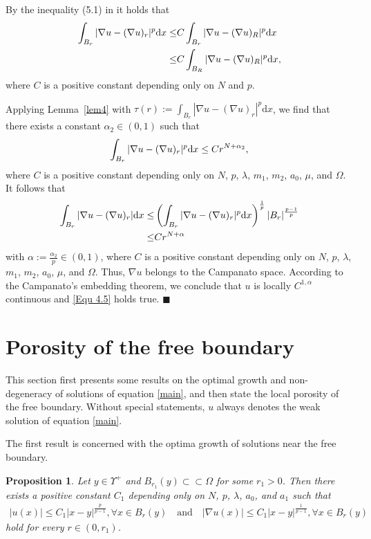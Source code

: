 \documentclass[onecolumn]{autart}
\newtheorem{proposition}{Proposition}
\newenvironment{proof}{{\it Proof: \enspace}}{\hfill $\blacksquare$\par}
\begin{document}
\begin{proof}
		By the inequality (5.1) in \cite{Lieberman:1991} it holds that
		\begin{align}
			\int_{B_r} |\nabla u - (\nabla u)_r|^p \mathrm{d}x
			\leq
			& C \int_{B_r} |\nabla u - (\nabla u)_R|^p \mathrm{d}x
			\notag\\ \leq
			&C \int_{B_R} |\nabla u - (\nabla u)_R|^p \mathrm{d}x,\notag
		\end{align}
		where $C$ is a positive  constant  depending only on $N$ and $p$.
		
		Applying Lemma~\ref{lem4}  with $\tau(r) := \int_{B_r} |\nabla u - (\nabla u)_r|^p\mathrm{d}x$, we find that there exists a constant $\alpha_2 \in (0, 1)$ such that
		\begin{align}
			\int_{B_r} |\nabla u - (\nabla u)_r|^p \mathrm{d}x \leq C r^{N+\alpha_2},\notag
		\end{align}
		where $C$ is a positive  constant  depending only on $N$,  $p$, $\lambda$, $m_1$, $m_2$, $a_0$, $\mu$, and $\Omega$.
		It follows that
		\begin{align}
			\int_{B_r} |\nabla u - (\nabla u)_r|\mathrm{d}x
			\leq
			&	\left( \int_{B_r} |\nabla u - (\nabla u)_r|^p \mathrm{d}x\right) ^\frac{1}{p} |B_r|^\frac{p-1}{p}
			\notag\\ \leq
			& Cr^{N+\alpha} \notag
		\end{align}
		with $\alpha := \frac{\alpha_2}{p} \in (0,1)$, where $C$ is  a positive constant depending only on $N$,  $p$, $\lambda$, $m_1$, $m_2$, $a_0$, $\mu$, and $\Omega$. Thus, $\nabla u$ belongs to the Campanato space. According to the Campanato's embedding theorem, we conclude that $u$ is locally  $C^{1,\alpha}$ continuous and \eqref{Equ 4.5} holds true.
	\end{proof}
	
	
	
	\section{Porosity of the free boundary}\label{Sec.5}
	This section  first presents some results on the optimal growth and  non-degeneracy of solutions of equation \eqref{main}, and then state the local porosity of the free boundary. Without special statements,  $u$ always denotes the weak solution of   equation \eqref{main}.
	
	
	The first result is concerned with the optima growth of solutions near the free boundary.
	\begin{proposition}\label{grow}
		Let $y \in \Upsilon^+$ and $B_{r_1}(y) \subset \subset \Omega$  for some $r_1 > 0$. Then there exists a positive constant $C_1$ depending only on $N$, $p$, $\lambda$, $a_0$, and $a_1$ such that
		\begin{align*}
			|u(x)| \leq C_1 |x - y|^{\frac{p}{p-1}},\forall x \in B_r(y) \quad\text{and}\quad |\nabla u(x)| \leq C_1 |x - y|^{\frac{1}{p-1}},  { \forall x \in B_r(y) }
		\end{align*}
		hold  for every $r \in (0, r_1)$.
	\end{proposition}
	
\end{document}
